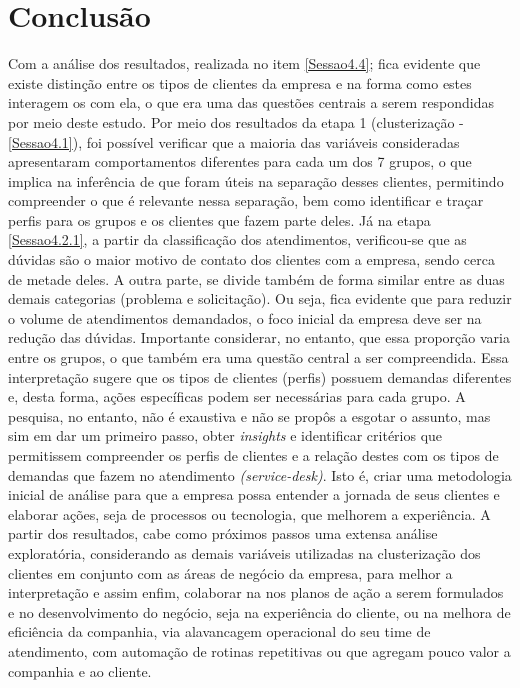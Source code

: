 \documentclass[twocolumn]{rbef}
\newcommand{\1}{\mathbbm{1}}
\begin{document}
\section{Conclusão} \label{Sessao5}
Com a análise dos resultados, realizada no item \ref{Sessao4.4}; fica evidente que existe distinção entre os tipos de clientes da empresa e na forma como estes interagem os com ela, o que era uma das questões centrais a serem respondidas por meio deste estudo.
Por meio dos resultados da etapa 1 (clusterização - \ref{Sessao4.1}), foi possível verificar que a maioria das variáveis consideradas apresentaram comportamentos diferentes para cada um dos 7 grupos, o que implica na inferência de que foram úteis na separação desses clientes, permitindo compreender o que é relevante nessa separação, bem como identificar e traçar perfis para os grupos e os clientes que fazem parte deles.
Já na etapa \ref{Sessao4.2.1}, a partir da classificação dos atendimentos, verificou-se que as dúvidas são o maior motivo de contato dos clientes com a empresa, sendo cerca de metade deles. A outra parte, se divide também de forma similar entre as duas demais categorias (problema e solicitação). Ou seja, fica evidente que para reduzir o volume de atendimentos demandados, o foco inicial da empresa deve ser na redução das dúvidas. Importante considerar, no entanto, que essa proporção varia entre os grupos, o que também era uma questão central a ser compreendida. Essa interpretação sugere que os tipos de clientes (perfis) possuem demandas diferentes e, desta forma, ações específicas podem ser necessárias para cada grupo.
A pesquisa, no entanto, não é exaustiva e não se propôs a esgotar o assunto, mas sim em dar um primeiro passo, obter \emph{insights} e identificar critérios que permitissem compreender os perfis de clientes e a relação destes com os tipos de demandas que fazem no atendimento \emph{(service-desk)}. Isto é, criar uma metodologia inicial de análise para que a empresa possa entender a jornada de seus clientes e elaborar ações, seja de processos ou tecnologia, que melhorem a experiência.
A partir dos resultados, cabe como próximos passos uma extensa análise exploratória, considerando as demais variáveis utilizadas na clusterização dos clientes em conjunto com as áreas de negócio da empresa, para melhor a interpretação e assim enfim, colaborar na nos planos de ação a serem formulados e no desenvolvimento do negócio, seja na experiência do cliente, ou na melhora de eficiência da companhia, via alavancagem operacional do seu time de atendimento, com automação de rotinas repetitivas ou que agregam pouco valor a companhia e ao cliente.
\end{document}
